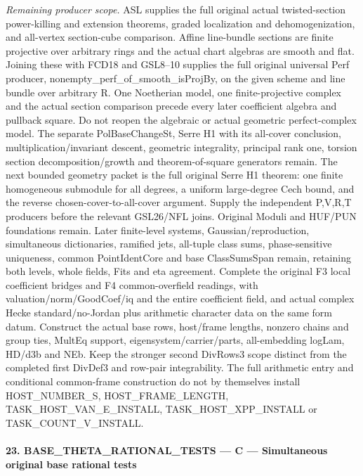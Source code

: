 \emph{Remaining producer scope.} ASL supplies the full original actual twisted-section power-killing and extension theorems, graded localization and dehomogenization, and all-vertex section-cube comparison. Affine line-bundle sections are finite projective over arbitrary rings and the actual chart algebras are smooth and flat. Joining these with FCD18 and GSL8–10 supplies the full original universal Perf producer, nonempty\_\allowbreak perf\_\allowbreak of\_\allowbreak smooth\_\allowbreak isProjBy, on the given scheme and line bundle over arbitrary R. One Noetherian model, one finite-projective complex and the actual section comparison precede every later coefficient algebra and pullback square. Do not reopen the algebraic or actual geometric perfect-complex model. The separate PolBaseChangeSt, Serre H1 with its all-cover conclusion, multiplication/invariant descent, geometric integrality, principal rank one, torsion section decomposition/growth and theorem-of-square generators remain. The next bounded geometry packet is the full original Serre H1 theorem: one finite homogeneous submodule for all degrees, a uniform large-degree Cech bound, and the reverse chosen-cover-to-all-cover argument. Supply the independent P,V,R,T producers before the relevant GSL26/NFL joins. Original Moduli and HUF/PUN foundations remain. Later finite-level systems, Gaussian/reproduction, simultaneous dictionaries, ramified jets, all-tuple class sums, phase-sensitive uniqueness, common PointIdentCore and base ClassSumsSpan remain, retaining both levels, whole fields, Fits and eta agreement. Complete the original F3 local coefficient bridges and F4 common-overfield readings, with valuation/norm/GoodCoef/iq and the entire coefficient field, and actual complex Hecke standard/no-Jordan plus arithmetic character data on the same form datum. Construct the actual base rows, host/frame lengths, nonzero chains and group ties, MultEq support, eigensystem/carrier/parts, all-embedding logLam, HD/d3b and NEb. Keep the stronger second DivRows3 scope distinct from the completed first DivDef3 and row-pair integrability. The full arithmetic entry and conditional common-frame construction do not by themselves install HOST\_\allowbreak NUMBER\_\allowbreak S, HOST\_\allowbreak FRAME\_\allowbreak LENGTH, TASK\_\allowbreak HOST\_\allowbreak VAN\_\allowbreak E\_\allowbreak INSTALL, TASK\_\allowbreak HOST\_\allowbreak XPP\_\allowbreak INSTALL or TASK\_\allowbreak COUNT\_\allowbreak V\_\allowbreak INSTALL.



\paragraph{23. BASE\_\allowbreak THETA\_\allowbreak RATIONAL\_\allowbreak TESTS — C — Simultaneous original base rational tests}


